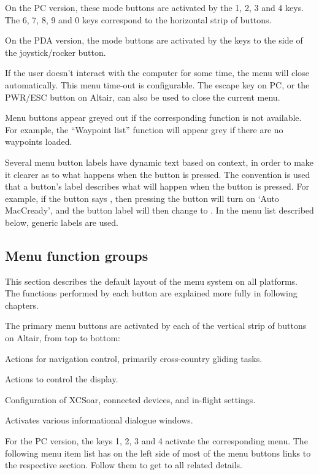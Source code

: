 On the PC version, these mode buttons are activated by the
1, 2, 3 and 4 keys.  The 6, 7, 8, 9 and 0 keys correspond to the horizontal
strip of buttons.

On the PDA version, the mode buttons are activated by the keys to the
side of the joystick/rocker button.

If the user doesn't interact with the computer for some time, the
menu will close automatically.  This menu time-out is configurable.
The escape key on PC, or the PWR/ESC button on Altair, can
also be used to close the current menu.

Menu buttons appear greyed out if the corresponding function is not available. 
For example, the ``Waypoint list'' function will appear grey if there are no waypoints loaded.

Several menu button labels have dynamic text based on context, in
order to make it clearer as to what happens when the button is
pressed.  The convention is used that a button's label describes what
will happen when the button is pressed.  For example, if the button
says , then pressing the button will turn on `Auto
MacCready', and the button label will then change to . 
In the menu list described below, generic labels are used.

\subsection*{Menu function groups}
This section describes the default layout of the menu system on all
platforms.  The functions performed by each button are explained more
fully in following chapters.

The primary menu buttons are activated by each of the vertical strip of buttons
on Altair, from top to bottom:
\begin{jspecs}
\item[\bmenu{Nav}] Actions for navigation control, primarily cross-country
gliding tasks.
\item[\bmenu{Display}] Actions to control the display.
\item[\bmenu{Config}] Configuration of XCSoar, connected devices, and in-flight
settings.
\item[\bmenu{Info}] Activates various informational dialogue windows.
\end{jspecs}

For the PC version, the keys 1, 2, 3 and 4 activate the 
corresponding menu.  The following menu item list has on the left side of most of the menu buttons links to the respective section. Follow them to get to all related details.

